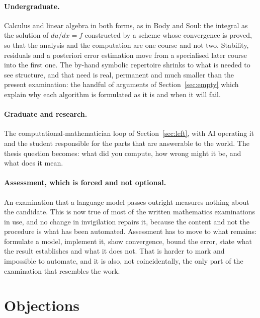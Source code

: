 \documentclass[11pt]{article}
\begin{document}
\paragraph{Undergraduate.} Calculus and linear algebra in both forms, as in Body and Soul: the
integral as the solution of $du/dx = f$ constructed by a scheme whose convergence is proved, so that
the analysis and the computation are one course and not two. Stability, residuals and a posteriori
error estimation move from a specialised later course into the first one. The by-hand symbolic
repertoire shrinks to what is needed to see structure, and that need is real, permanent and much
smaller than the present examination: the handful of arguments of Section~\ref{sec:empty} which
explain why each algorithm is formulated as it is and when it will fail.

\paragraph{Graduate and research.} The computational-mathematician loop of Section~\ref{sec:left},
with AI operating it and the student responsible for the parts that are answerable to the world.
The thesis question becomes: what did you compute, how wrong might it be, and what does it mean.

\paragraph{Assessment, which is forced and not optional.} An examination that a language model passes
outright measures nothing about the candidate. This is now true of most of the written mathematics
examinations in use, and no change in invigilation repairs it, because the content and not the
procedure is what has been automated. Assessment has to move to what remains: formulate a model,
implement it, show convergence, bound the error, state what the result establishes and what it does
not. That is harder to mark and impossible to automate, and it is also, not coincidentally, the only
part of the examination that resembles the work.

\section{Objections}\label{sec:objections}
\end{document}
